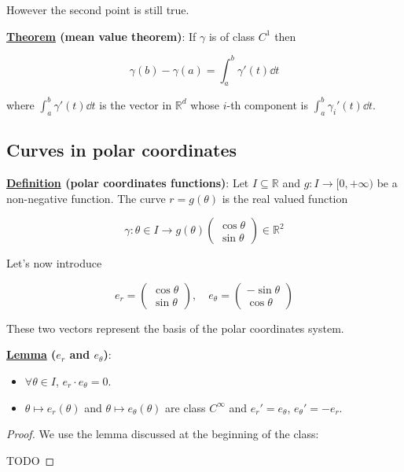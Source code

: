 \documentclass[10pt]{extarticle}
\newcommand{\R}{\mathbb{R}}
\begin{document}
However the second point is still true.

\textbf{\underline{Theorem} (mean value theorem)}:
If $\gamma$ is of class $C^1$ then

$$
    \gamma(b) - \gamma(a) = \int_a^b \gamma'(t) \dd{t}
$$

where $\int_a^b \gamma'(t) \dd{t}$ is the vector in $\R^d$ whose $i$-th component is $\int_a^b \gamma_i'(t) \dd{t}$.

\subsection{Curves in polar coordinates}

\textbf{\underline{Definition} (polar coordinates functions)}:
Let $I \subseteq \R$ and $g: I \to [0, +\infty)$ be a non-negative function.
The curve $r = g(\theta)$ is the real valued function

$$
    \gamma: \theta \in I \to g(\theta) \begin{pmatrix}
        \cos \theta \\ \sin \theta
    \end{pmatrix} \in \R^2
$$

Let's now introduce

$$
    e_r = \begin{pmatrix}
        \cos \theta \\ \sin \theta
    \end{pmatrix},
    \quad
    e_\theta = \begin{pmatrix}
        -\sin \theta \\ \cos \theta
    \end{pmatrix}
$$

These two vectors represent the basis of the polar coordinates system.

\textbf{\underline{Lemma} ($e_r$ and $e_\theta$)}:
\begin{itemize}
    \item $\forall \theta \in I$, $e_r \cdot e_\theta = 0$.
    \item $\theta \mapsto e_r(\theta)$ and $\theta \mapsto e_\theta(\theta)$ are class $C^\infty$ and $e_r' = e_\theta$, $e_\theta' = -e_r$.
\end{itemize}

\begin{proof}
    We use the lemma discussed at the beginning of the class:

    TODO
\end{proof}
\end{document}
